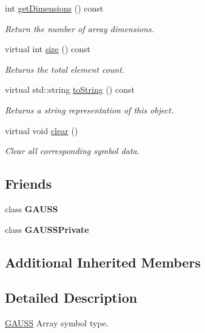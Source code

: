 \begin{DoxyCompactItemize}
int \hyperlink{class_g_e_array_afad41971475ee5588ba8f5d0d396b5fc}{get\-Dimensions} () const 
\begin{DoxyCompactList}\small\item\em Return the number of array dimensions. \end{DoxyCompactList}\item 
virtual int \hyperlink{class_g_e_array_a4030556e997a324e09abcf46e6a9e7ef}{size} () const 
\begin{DoxyCompactList}\small\item\em Returns the total element count. \end{DoxyCompactList}\item 
virtual std\-::string \hyperlink{class_g_e_array_a9f0f5b80ff919ebbf663e0e2ad257512}{to\-String} () const 
\begin{DoxyCompactList}\small\item\em Returns a string representation of this object. \end{DoxyCompactList}\item 
virtual void \hyperlink{class_g_e_array_ad7fd6880da03d11c13387ea9e1e1cd5d}{clear} ()
\begin{DoxyCompactList}\small\item\em Clear all corresponding symbol data. \end{DoxyCompactList}\end{DoxyCompactItemize}
\subsection*{Friends}
\begin{DoxyCompactItemize}
\item 
\hypertarget{class_g_e_array_abc89e64d0ec6c939575c3125753c6309}{class {\bfseries G\-A\-U\-S\-S}}\label{class_g_e_array_abc89e64d0ec6c939575c3125753c6309}

\item 
\hypertarget{class_g_e_array_a2e5e14117f0e69078f45b8d512f056de}{class {\bfseries G\-A\-U\-S\-S\-Private}}\label{class_g_e_array_a2e5e14117f0e69078f45b8d512f056de}

\end{DoxyCompactItemize}
\subsection*{Additional Inherited Members}


\subsection{Detailed Description}
\hyperlink{class_g_a_u_s_s}{G\-A\-U\-S\-S} Array symbol type. 

